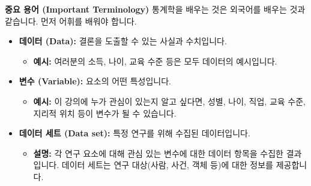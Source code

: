 \documentclass[11pt,a4paper]{book}
\theoremstyle{definition}
\begin{document}
\begin{summarybox}
\textbf{중요 용어 (Important Terminology)}
통계학을 배우는 것은 외국어를 배우는 것과 같습니다. 먼저 어휘를 배워야 합니다.
\begin{itemize}
    \item \textbf{데이터 (Data):} 결론을 도출할 수 있는 사실과 수치입니다.
    \begin{itemize}
        \item \textbf{예시:} 여러분의 소득, 나이, 교육 수준 등은 모두 데이터의 예시입니다.
    \end{itemize}
    \item \textbf{변수 (Variable):} 요소의 어떤 특성입니다.
    \begin{itemize}
        \item \textbf{예시:} 이 강의에 누가 관심이 있는지 알고 싶다면, 성별, 나이, 직업, 교육 수준, 지리적 위치 등이 변수가 될 수 있습니다.
    \end{itemize}
    \item \textbf{데이터 세트 (Data set):} 특정 연구를 위해 수집된 데이터입니다.
    \begin{itemize}
        \item \textbf{설명:} 각 연구 요소에 대해 관심 있는 변수에 대한 데이터 항목을 수집한 결과입니다. 데이터 세트는 연구 대상(사람, 사건, 객체 등)에 대한 정보를 제공합니다.
    \end{itemize}
\end{itemize}
\end{summarybox}
\end{document}
